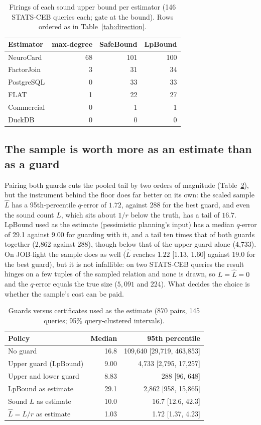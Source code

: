 \documentclass[sigconf, nonacm]{acmart}
\begin{document}
\begin{table}[t]
\centering
\caption{Firings of each sound upper bound per estimator (146 STATS-CEB
queries each; gate at the bound). Rows ordered as in
Table~\ref{tab:direction}.}
\label{tab:tightness}
\footnotesize
\begin{tabular}{@{}lrrr@{}}
\toprule
Estimator & max-degree & SafeBound & LpBound \\ \midrule
NeuroCard & 68 & 101 & 100 \\
FactorJoin & 3 & 31 & 34 \\
PostgreSQL & 0 & 33 & 33 \\
FLAT & 1 & 22 & 27 \\
Commercial & 0 & 1 & 1 \\
DuckDB & 0 & 0 & 0 \\
\bottomrule
\end{tabular}
\end{table}

\subsection{The sample is worth more as an estimate than as a guard}
Pairing both guards cuts the pooled tail by two orders of magnitude
(Table~\ref{tab:asestimate}), but the instrument behind the floor does far
better on its own: the scaled sample $\hat L$ has a 95th-percentile $q$-error of
$1.72$, against $288$ for the best guard, and even the sound count $L$, which
sits about $1/r$ below the truth, has a tail of $16.7$. LpBound used as the
estimate (pessimistic planning's input) has a median $q$-error of 29.1 against
9.00 for guarding with it, and a tail ten times that of both guards together
(2{,}862 against 288), though below that of the upper guard alone (4{,}733).
On JOB-light the sample does as well ($\hat L$ reaches $1.22$ [1.13, 1.60]
against $19.0$ for the best guard), but it is not infallible: on two STATS-CEB
queries the result hinges on a few tuples of the sampled relation and none is
drawn, so $L=\hat L=0$ and the $q$-error equals the true size ($5{,}091$ and
$224$). What decides the choice is whether the sample's cost can be paid.

\begin{table}[t]
\centering
\caption{Guards versus certificates used as the estimate (870 pairs, 145
queries; 95\% query-clustered intervals).}
\label{tab:asestimate}
\small
\begin{tabular}{@{}lrr@{}}
\toprule
Policy & Median & 95th percentile \\ \midrule
No guard            & 16.8 & 109{,}640 [29{,}719, 463{,}853] \\
Upper guard (LpBound) & 9.00 & 4{,}733 [2{,}795, 17{,}257] \\
Upper and lower guard & 8.83 & 288 [96, 648] \\
LpBound as estimate & 29.1 & 2{,}862 [958, 15{,}865] \\
Sound $L$ as estimate & 10.0 & 16.7 [12.6, 42.3] \\
$\hat L = L/r$ as estimate & 1.03 & 1.72 [1.37, 4.23] \\
\bottomrule
\end{tabular}
\end{table}
\end{document}
